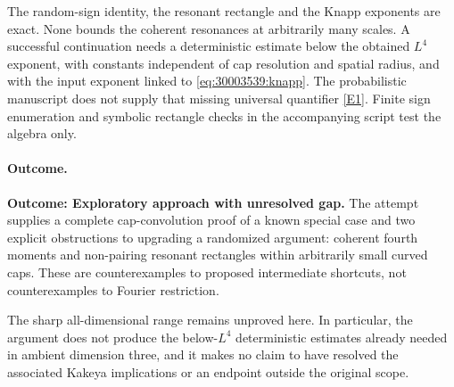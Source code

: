 \documentclass[11pt,a4paper]{article}
\newcommand{\eref}[2]{\hyperlink{extra:#1:#2}{[E#2]}}
\numberwithin{equation}{section}
\begin{document}
The random-sign identity, the resonant rectangle and the Knapp exponents
are exact. None bounds the coherent resonances at arbitrarily many scales.
A successful continuation needs a deterministic estimate below the obtained
$L^4$ exponent, with constants independent of cap resolution and spatial
radius, and with the input exponent linked to \eqref{eq:30003539:knapp}. The
probabilistic manuscript does not supply that missing universal quantifier
\eref{30003539}{1}. Finite sign enumeration and symbolic rectangle checks in the
accompanying script test the algebra only.

\paragraph{Outcome.}
\textbf{Outcome: Exploratory approach with unresolved gap.}
The attempt supplies a complete cap-convolution proof of a known special
case and two explicit obstructions to upgrading a randomized argument:
coherent fourth moments and non-pairing resonant rectangles within arbitrarily
small curved caps. These are counterexamples to proposed intermediate
shortcuts, not counterexamples to Fourier restriction.

The sharp all-dimensional range remains unproved here. In particular,
the argument does not produce the below-$L^4$ deterministic estimates already
needed in ambient dimension three, and it makes no claim to have resolved
the associated Kakeya implications or an endpoint outside the original scope.
\end{document}
